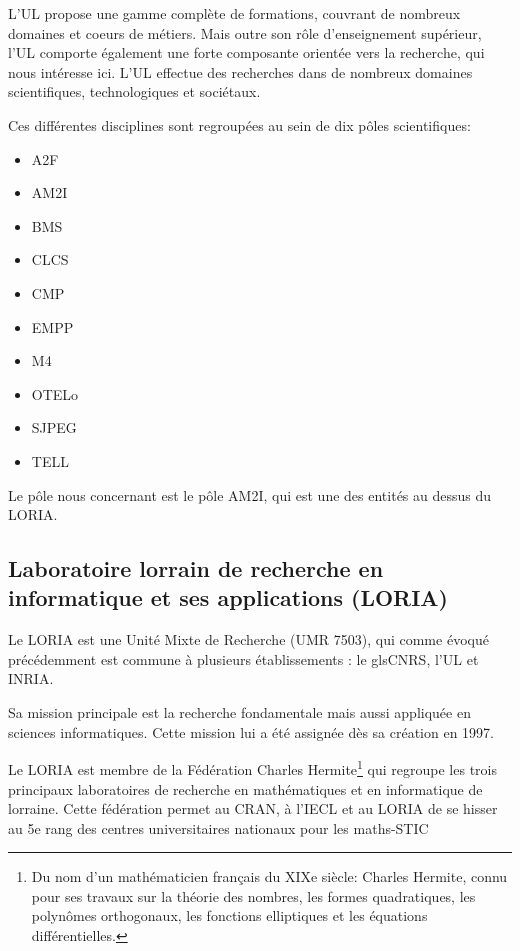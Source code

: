 \documentclass{tnreport}
\begin{document}
\vspace{0.5cm}
L'\gls{UL} propose une gamme complète de formations, couvrant de nombreux domaines et coeurs de métiers. Mais outre son rôle d'enseignement supérieur, l'\gls{UL} comporte également une forte composante orientée vers la recherche, qui nous intéresse ici. L'\gls{UL} effectue des recherches dans de nombreux domaines scientifiques, technologiques et sociétaux. 

Ces différentes disciplines sont regroupées au sein de dix pôles scientifiques:
\begin{itemize}
\item \gls{A2F}   
\item \gls{AM2I}
\item \gls{BMS}
\item \gls{CLCS}
\item \gls{CMP}
\item \gls{EMPP}
\item \gls{M4}
\item \gls{OTELo}
\item \gls{SJPEG}
\item \gls{TELL}
\end{itemize}
\vspace{0.5cm}
Le pôle nous concernant est le pôle \gls{AM2I}, qui est une des entités au dessus du \gls{LORIA}.
\subsection{Laboratoire lorrain de recherche en informatique et ses applications (LORIA)}\label{lb:loria}
Le \gls{LORIA} est une Unité Mixte de Recherche (UMR 7503), qui comme évoqué précédemment est commune à plusieurs établissements : le gls\gls{CNRS}, l’\gls{UL} et \gls{INRIA}.

Sa mission principale est la recherche fondamentale mais aussi appliquée en sciences informatiques. Cette mission lui a été assignée dès sa création en 1997.

Le \gls{LORIA} est membre de la Fédération Charles Hermite\footnote{Du nom d'un mathématicien français du XIXe siècle: Charles Hermite, connu pour ses travaux sur la théorie des nombres, les formes quadratiques, les polynômes orthogonaux, les fonctions elliptiques et les équations différentielles.} qui regroupe les trois principaux laboratoires de recherche en mathématiques et en informatique de lorraine. Cette fédération permet au \gls{CRAN}, à l'\gls{IECL} et au \gls{LORIA} de se hisser au 5e rang des centres universitaires nationaux pour les maths-STIC
\end{document}
